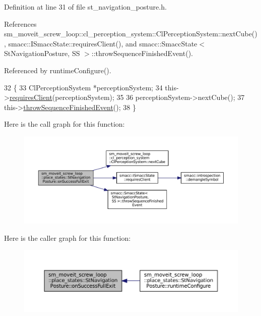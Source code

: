 Definition at line 31 of file st\+\_\+navigation\+\_\+posture.\+h.



References sm\+\_\+moveit\+\_\+screw\+\_\+loop\+::cl\+\_\+perception\+\_\+system\+::\+Cl\+Perception\+System\+::next\+Cube(), smacc\+::\+I\+Smacc\+State\+::requires\+Client(), and smacc\+::\+Smacc\+State$<$ St\+Navigation\+Posture, S\+S $>$\+::throw\+Sequence\+Finished\+Event().



Referenced by runtime\+Configure().


\begin{DoxyCode}
32             \{
33                 ClPerceptionSystem *perceptionSystem;
34                 this->\hyperlink{classsmacc_1_1ISmaccState_a7f95c9f0a6ea2d6f18d1aec0519de4ac}{requiresClient}(perceptionSystem);
35 
36                 perceptionSystem->nextCube();
37                 this->\hyperlink{classsmacc_1_1SmaccState_a49dcfc25824f7e083dd4b999c49ab2b6}{throwSequenceFinishedEvent}();
38             \}
\end{DoxyCode}
Here is the call graph for this function\+:
\nopagebreak
\begin{figure}[H]
\begin{center}
\leavevmode
\includegraphics[width=350pt]{structsm__moveit__screw__loop_1_1place__states_1_1StNavigationPosture_a8d05eb1ba1269dae6030e73ba8240109_cgraph}
\end{center}
\end{figure}
Here is the caller graph for this function\+:
\nopagebreak
\begin{figure}[H]
\begin{center}
\leavevmode
\includegraphics[width=350pt]{structsm__moveit__screw__loop_1_1place__states_1_1StNavigationPosture_a8d05eb1ba1269dae6030e73ba8240109_icgraph}
\end{center}
\end{figure}
